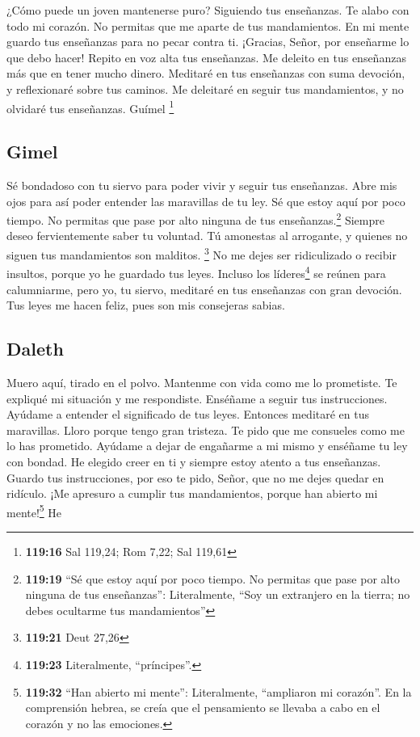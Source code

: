  ¿Cómo puede un joven mantenerse puro? Siguiendo tus
enseñanzas.  Te alabo con todo mi corazón. No permitas
que me aparte de tus mandamientos.  En mi mente guardo
tus enseñanzas para no pecar contra ti.  ¡Gracias, Señor,
por enseñarme lo que debo hacer!  Repito en voz alta tus
enseñanzas.  Me deleito en tus enseñanzas más que en
tener mucho dinero.  Meditaré en tus enseñanzas con suma
devoción, y reflexionaré sobre tus caminos.  Me deleitaré
en seguir tus mandamientos, y no olvidaré tus enseñanzas. Guímel
\footnote{\textbf{119:16} Sal 119,24; Rom 7,22; Sal 119,61}

\hypertarget{gimel}{%
\subsection{Gimel}\label{gimel}}

 Sé bondadoso con tu siervo para poder vivir y seguir tus
enseñanzas.  Abre mis ojos para así poder entender las
maravillas de tu ley.  Sé que estoy aquí por poco tiempo.
No permitas que pase por alto ninguna de tus enseñanzas.\footnote{\textbf{119:19}
  ``Sé que estoy aquí por poco tiempo. No permitas que pase por alto
  ninguna de tus enseñanzas'': Literalmente, ``Soy un extranjero en la
  tierra; no debes ocultarme tus mandamientos''}  Siempre
deseo fervientemente saber tu voluntad.  Tú amonestas al
arrogante, y quienes no siguen tus mandamientos son malditos.
\footnote{\textbf{119:21} Deut 27,26}  No me dejes ser
ridiculizado o recibir insultos, porque yo he guardado tus leyes.
 Incluso los líderes\footnote{\textbf{119:23}
  Literalmente, ``príncipes''.} se reúnen para calumniarme, pero yo, tu
siervo, meditaré en tus enseñanzas con gran devoción. 
Tus leyes me hacen feliz, pues son mis consejeras sabias.

\hypertarget{daleth}{%
\subsection{Daleth}\label{daleth}}

 Muero aquí, tirado en el polvo. Mantenme con vida como
me lo prometiste.  Te expliqué mi situación y me
respondiste. Enséñame a seguir tus instrucciones. 
Ayúdame a entender el significado de tus leyes. Entonces meditaré en tus
maravillas.  Lloro porque tengo gran tristeza. Te pido
que me consueles como me lo has prometido.  Ayúdame a
dejar de engañarme a mi mismo y enséñame tu ley con bondad.
 He elegido creer en ti y siempre estoy atento a tus
enseñanzas.  Guardo tus instrucciones, por eso te pido,
Señor, que no me dejes quedar en ridículo.  ¡Me apresuro
a cumplir tus mandamientos, porque han abierto mi mente!\footnote{\textbf{119:32}
  ``Han abierto mi mente'': Literalmente, ``ampliaron mi corazón''. En
  la comprensión hebrea, se creía que el pensamiento se llevaba a cabo
  en el corazón y no las emociones.} He

